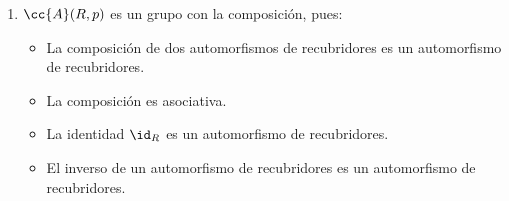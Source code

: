 \begin{observacion}
\begin{enumerate}
        \item $\cc{A}(R,p)$ es un grupo con la composición, pues:
        \begin{itemize}
            \item La composición de dos automorfismos de recubridores es un automorfismo de recubridores.
            \item La composición es asociativa.
            \item La identidad $\id_R$ es un automorfismo de recubridores.
            \item El inverso de un automorfismo de recubridores es un automorfismo de recubridores.
        \end{itemize}
    \end{enumerate}
\end{observacion}


